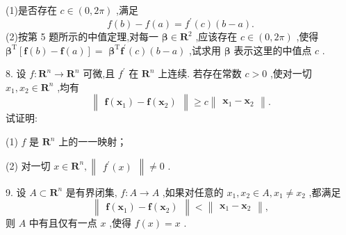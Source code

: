 (1)是否存在 \(c \in  \left( {0,{2\pi }}\right)\) ,满足
\[
f\left( b\right)  - f\left( a\right)  = {f}^{\prime }\left( c\right) \left( {b - a}\right) .
\]
(2)按第 5 题所示的中值定理,对每一 \(\mathbf{\beta } \in  {\mathbf{R}}^{2}\) ,应该存在 \(c \in  \left( {0,{2\pi }}\right)\) ,使得 \({\mathbf{\beta }}^{\mathrm{T}}\left\lbrack  {\mathbf{f}\left( b\right)  - \mathbf{f}\left( a\right) }\right\rbrack   =\)  \({\mathbf{\beta }}^{\mathrm{T}}{\mathbf{f}}^{\prime }\left( c\right) \left( {b - a}\right)\) ,试求用 \(\mathbf{\beta }\) 表示这里的中值点 \(c\) .

8. 设 \(f : {\mathbf{R}}^{n} \rightarrow  {\mathbf{R}}^{n}\) 可微,且 \({f}^{\prime }\) 在 \({\mathbf{R}}^{n}\) 上连续. 若存在常数 \(c > 0\) ,使对一切 \({x}_{1},{x}_{2} \in  {\mathbf{R}}^{n}\) ,均有
\[
\begin{Vmatrix}{\mathbf{f}\left( {\mathbf{x}}_{1}\right)  - \mathbf{f}\left( {\mathbf{x}}_{2}\right) }\end{Vmatrix} \geq  c\begin{Vmatrix}{{\mathbf{x}}_{1} - {\mathbf{x}}_{2}}\end{Vmatrix}.
\]
试证明:

(1) \(f\) 是 \({\mathbf{R}}^{n}\) 上的一一映射；

(2) 对一切 \(x \in  {\mathbf{R}}^{n},\begin{Vmatrix}{{f}^{\prime }\left( x\right) }\end{Vmatrix} \neq  0\) .

9. 设 \(A \subset  {\mathbf{R}}^{n}\) 是有界闭集, \(f : A \rightarrow  A\) ,如果对任意的 \({x}_{1},{x}_{2} \in  A,{x}_{1} \neq  {x}_{2}\) ,都满足
\[
\begin{Vmatrix}{\mathbf{f}\left( {\mathbf{x}}_{1}\right)  - \mathbf{f}\left( {\mathbf{x}}_{2}\right) }\end{Vmatrix} < \begin{Vmatrix}{{\mathbf{x}}_{1} - {\mathbf{x}}_{2}}\end{Vmatrix},
\]
则 \(A\) 中有且仅有一点 \(x\) ,使得 \(f\left( x\right)  = x\) .

